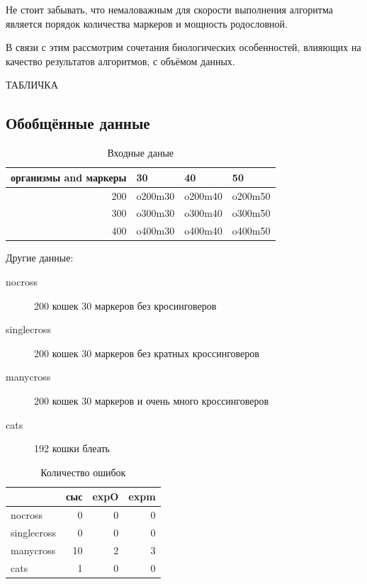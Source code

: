 \documentclass{matmex-diploma-custom}
\begin{document}
Не стоит забывать, что немаловажным для скорости выполнения алгоритма
является порядок количества маркеров и мощность родословной.

В связи с этим рассмотрим сочетания биологических особенностей,
влияющих на качество результатов алгоритмов, с объёмом данных.

ТАБЛИЧКА

\subsection{Обобщённые данные}

\begin{table}[h]
  \centering
\begin{tabular}{rlll}
\hline
организмы and маркеры & 30 & 40 & 50 \\
\hline
200 & o200m30 & o200m40 & o200m50 \\
300 & o300m30 & o300m40 & o300m50 \\
400 & o400m30 & o400m40 & o400m50 \\
\hline
\end{tabular}
  \caption{Входные даные}
  \label{tab:data}
\end{table}

Другие данные:
\begin{description}
\item[nocross] 200 кошек 30 маркеров без кросинговеров
\item[singlecross] 200 кошек 30 маркеров без кратных кроссинговеров
\item[manycross] 200 кошек 30 маркеров и очень много кроссинговеров
\item[cats] 192 кошки блеать
\end{description}

\begin{table}[h]
  \centering
  \begin{tabular}{lrrr}
    \hline
    & сыс & expO & expm \\
    \hline
    nocross & 0 & 0 & 0 \\
    singlecross & 0 & 0 & 0 \\
    manycross & 10 & 2 & 3 \\
    cats & 1 & 0 & 0 \\
    \hline
  \end{tabular}
  \caption{Количество ошибок}
  \label{tab:perf}
\end{table}
\end{document}
